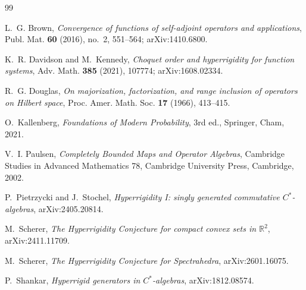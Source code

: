 \documentclass[11pt,a4paper]{amsart}
\theoremstyle{remark}
\begin{document}
\begin{thebibliography}{99}

L.~G. Brown,
\emph{Convergence of functions of self-adjoint operators and applications},
Publ. Mat. \textbf{60} (2016), no.~2, 551--564;
arXiv:1410.6800.

K.~R. Davidson and M.~Kennedy,
\emph{Choquet order and hyperrigidity for function systems},
Adv. Math. \textbf{385} (2021), 107774;
arXiv:1608.02334.

R.~G. Douglas,
\emph{On majorization, factorization, and range inclusion of operators on
Hilbert space},
Proc. Amer. Math. Soc. \textbf{17} (1966), 413--415.

O.~Kallenberg,
\emph{Foundations of Modern Probability},
3rd ed., Springer, Cham, 2021.

V.~I. Paulsen,
\emph{Completely Bounded Maps and Operator Algebras},
Cambridge Studies in Advanced Mathematics 78,
Cambridge University Press, Cambridge, 2002.

P.~Pietrzycki and J.~Stochel,
\emph{Hyperrigidity I: singly generated commutative \(C^*\)-algebras},
arXiv:2405.20814.

M.~Scherer,
\emph{The Hyperrigidity Conjecture for compact convex sets in
\(\mathbb R^2\)},
arXiv:2411.11709.

M.~Scherer,
\emph{The Hyperrigidity Conjecture for Spectrahedra},
arXiv:2601.16075.

P.~Shankar,
\emph{Hyperrigid generators in \(C^*\)-algebras},
arXiv:1812.08574.

\end{thebibliography}
\end{document}
